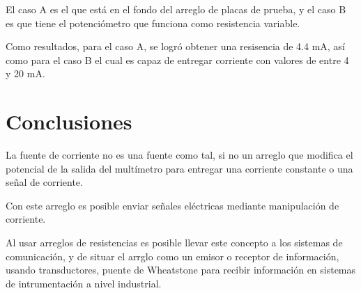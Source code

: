 \documentclass{article}
\begin{document}
El caso A es el que está en el fondo del arreglo de placas de prueba, y el caso B es que tiene el potenciómetro que funciona
como resistencia variable.

Como resultados, para el caso A, se logró obtener una resisencia de 4.4 mA, así como para el caso B el cual es capaz de entregar
corriente con valores de entre 4 y 20 mA.


\section{Conclusiones}
La fuente de corriente no es una fuente como tal, si no un arreglo que modifica el potencial de la salida del multímetro
para entregar una corriente constante o una señal de corriente.

Con este arreglo es posible enviar señales eléctricas mediante manipulación de corriente.

Al usar arreglos de resistencias es posible llevar este concepto a los sistemas de comunicación, y de situar el arrglo como
un emisor o receptor de información, usando transductores, puente de Wheatstone para recibir información en sistemas de
intrumentación a nivel industrial.

\printbibliography
\end{document}
